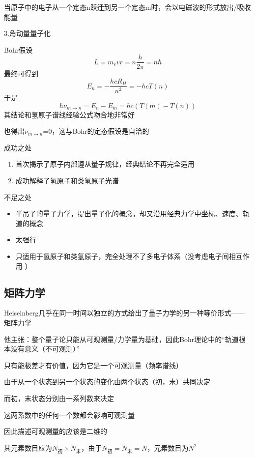 \documentclass[lang=cn,10pt]{elegantbook}
\begin{document}
当原子中的电子从一个定态n跃迁到另一个定态m时，会以电磁波的形式放出/吸收能量

3.角动量量子化

Bohr假设
\begin{equation}
	L=m_evr=n\frac{h}{2\pi}=n\hbar
\end{equation}
最终可得到
\begin{equation}
	E_n=-\frac{hcR_H}{n^2}=-hcT(n)
\end{equation}
于是
\begin{equation}
	h\nu_{m\rightarrow n}=E_n-E_m=hc(T(m)-T(n))
\end{equation}
其结论和氢原子谱线经验公式吻合地非常好

也得出$\nu_{m\rightarrow n}$=0，这与Bohr的定态假设是自洽的

成功之处
\begin{enumerate}
	\item 首次揭示了原子内部遵从量子规律，经典结论不再完全适用
	
	\item 成功解释了氢原子和类氢原子光谱
\end{enumerate}

不足之处
\begin{itemize}
	\item 半吊子的量子力学，提出量子化的概念，却又沿用经典力学中坐标、速度、轨道的概念
	\item 太强行
	\item 只适用于氢原子和类氢原子，完全处理不了多电子体系（没考虑电子间相互作用  ）
\end{itemize}
\subsection{矩阵力学}

Heiseinberg几乎在同一时间以独立的方式给出了量子力学的另一种等价形式——矩阵力学

他主张：整个量子论只能从可观测量/力学量为基础，因此Bohr理论中的“轨道根本没有意义（不可观测）”

只有能极差才有价值，因为它是一个可观测量（频率谱线）

由于从一个状态到另一个状态的变化由两个状态（初，末）共同决定

而初，末状态分别由一系列数来决定

这两系数中的任何一个数都会影响可观测量

因此描述可观测量的应该是二维的

其元素数目应为$N_{\text{初}}\times N_{\text{末}} $，由于$N_{\text{初}}= N_{\text{末}} =N$，元素数目为$N^2$
\end{document}
